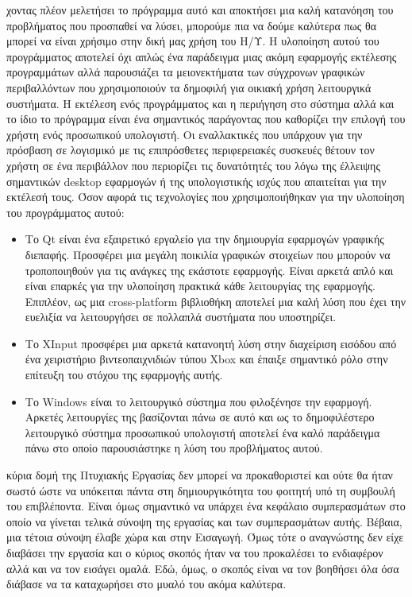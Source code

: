 χοντας πλέον μελετήσει το πρόγραμμα αυτό και αποκτήσει μια καλή κατανόηση του
προβλήματος που προσπαθεί να λύσει, μπορούμε πια να δούμε καλύτερα πως θα μπορεί
να είναι χρήσιμο στην δική μας χρήση του Η/Υ. Η υλοποίηση αυτού του προγράμματος
αποτελεί όχι απλώς ένα παράδειγμα μιας ακόμη εφαρμογής εκτέλεσης προγραμμάτων αλλά
παρουσιάζει τα μειονεκτήματα των σύγχρονων γραφικών περιβαλλόντων που χρησιμοποιούν
τα δημοφιλή για οικιακή χρήση λειτουργικά συστήματα. Η εκτέλεση ενός προγράμματος
και η περιήγηση στο σύστημα αλλά και το ίδιο το πρόγραμμα είναι ένα σημαντικός παράγοντας
που καθορίζει την επιλογή του χρήστη ενός προσωπικού υπολογιστή. Οι εναλλακτικές που
υπάρχουν για την πρόσβαση σε λογισμικό με τις επιπρόσθετες περιφερειακές συσκευές
θέτουν τον χρήστη σε ένα περιβάλλον που περιορίζει τις δυνατότητές του λόγω της έλλειψης
σημαντικών desktop εφαρμογών ή της υπολογιστικής ισχύς που απαιτείται για την εκτέλεσή τους.
Όσον αφορά τις τεχνολογίες που χρησιμοποιήθηκαν για την υλοποίηση του προγράμματος αυτού:
\begin{itemize}
	\item
Το Qt είναι ένα εξαιρετικό εργαλείο για την δημιουργία εφαρμογών γραφικής διεπαφής. Προσφέρει
μια μεγάλη ποικιλία γραφικών στοιχείων που μπορούν να τροποποιηθούν για τις ανάγκες της εκάστοτε
εφαρμογής. Είναι αρκετά απλό και είναι επαρκές για την υλοποίηση πρακτικά κάθε λειτουργίας της
εφαρμογής. Επιπλέον, ως μια cross-platform βιβλιοθήκη αποτελεί μια καλή λύση που έχει την ευελιξία
να λειτουργήσει σε πολλαπλά συστήματα που υποστηρίζει.
	\item
Το XInput προσφέρει μια αρκετά κατανοητή λύση στην διαχείριση εισόδου από ένα χειριστήριο βιντεοπαιχνιδιών
τύπου Xbox και έπαιξε σημαντικό ρόλο στην επίτευξη του στόχου της εφαρμογής αυτής.
	\item
Το Windows είναι το λειτουργικό σύστημα που φιλοξένησε την εφαρμογή. Αρκετές λειτουργίες της βασίζονται πάνω
σε αυτό και ως το δημοφιλέστερο λειτουργικό σύστημα προσωπικού υπολογιστή αποτελεί ένα καλό παράδειγμα πάνω
στο οποίο παρουσιάστηκε η λύση του προβλήματος αυτού.
\end{itemize} 


κύρια δομή της Πτυχιακής Εργασίας δεν μπορεί 
να προκαθοριστεί και ούτε θα ήταν σωστό 
ώστε να υπόκειται πάντα στη δημιουργικότητα
του φοιτητή υπό τη συμβουλή του επιβλέποντα.
Είναι όμως σημαντικό να υπάρχει ένα κεφάλαιο συμπερασμάτων στο 
οποίο να γίνεται τελικά σύνοψη της εργασίας και των συμπερασμάτων αυτής.
Βέβαια, μια τέτοια σύνοψη έλαβε χώρα και στην Εισαγωγή. 
Όμως τότε ο αναγνώστης δεν είχε διαβάσει την εργασία και ο
κύριος σκοπός ήταν να του προκαλέσει το ενδιαφέρον αλλά και να 
τον εισάγει ομαλά. 
Εδώ, όμως, ο σκοπός είναι να τον βοηθήσει όλα όσα διάβασε να τα καταχωρήσει
στο μυαλό του ακόμα καλύτερα.



